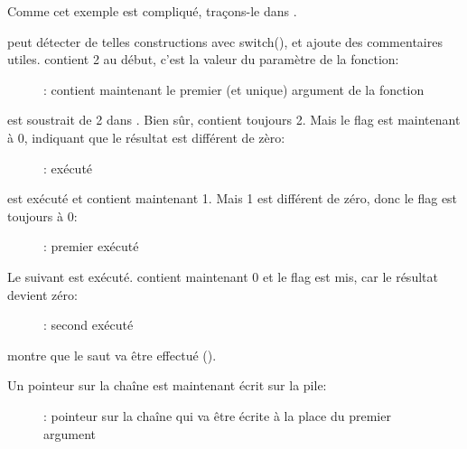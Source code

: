 ﻿\clearpage
\mysubparagraph{\olly}

Comme cet exemple est compliqué, traçons-le dans \olly.

\olly peut détecter de telles constructions avec switch(), et ajoute des commentaires
utiles.
\EAX contient 2 au début, c'est la valeur du paramètre de la fonction:

\begin{figure}[H]
\centering
{}
\caption{\olly: \EAX 
contient maintenant le premier (et unique) argument de la fonction}
\label{fig:switch_few_olly1}
\end{figure}

 est soustrait de 2 dans \EAX.
Bien sûr, \EAX contient toujours 2.
Mais le flag \ZF est maintenant à 0, indiquant que le résultat est différent de
zèro:

\begin{figure}[H]
\centering
{}
\caption{\olly: \SUB exécuté}
\label{fig:switch_few_olly2}
\end{figure}

\clearpage
\DEC est exécuté et \EAX contient maintenant 1.
Mais 1 est différent de zéro, donc le flag \ZF est toujours à 0:

\begin{figure}[H]
\centering
{}
\caption{\olly: premier \DEC exécuté}
\label{fig:switch_few_olly3}
\end{figure}

\clearpage
Le \DEC suivant est exécuté.
\EAX contient maintenant 0 et le flag \ZF est mis, car le résultat devient zéro:

\begin{figure}[H]
\centering
{}
\caption{\olly: second \DEC exécuté}
\label{fig:switch_few_olly4}
\end{figure}

\olly montre que le saut va être effectué ().

\clearpage
Un pointeur sur la chaîne  est maintenant écrit sur la pile:

\begin{figure}[H]
\centering
{}
\caption{\olly: 
pointeur sur la chaîne qui va être écrite à la place du premier argument}
\label{fig:switch_few_olly5}
\end{figure}

